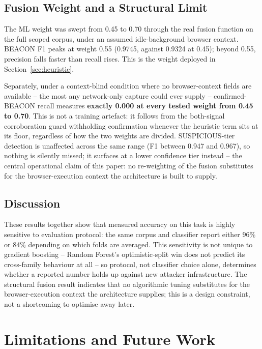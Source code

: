 \documentclass[conference,a4paper]{IEEEtran}
\begin{document}
\subsection{Fusion Weight and a Structural Limit}\label{sec:fusionlimit}
The ML weight was swept from 0.45 to 0.70 through the real fusion function on the full scoped corpus, under an assumed idle-background browser context. BEACON F1 peaks at weight 0.55 (0.9745, against 0.9324 at 0.45); beyond 0.55, precision falls faster than recall rises. This is the weight deployed in Section~\ref{sec:heuristic}.

Separately, under a context-blind condition where no browser-context fields are available -- the most any network-only capture could ever supply -- confirmed-BEACON recall measures \textbf{exactly 0.000 at every tested weight from 0.45 to 0.70}. This is not a training artefact: it follows from the both-signal corroboration guard withholding confirmation whenever the heuristic term sits at its floor, regardless of how the two weights are divided. SUSPICIOUS-tier detection is unaffected across the same range (F1 between 0.947 and 0.967), so nothing is silently missed; it surfaces at a lower confidence tier instead -- the central operational claim of this paper: no re-weighting of the fusion substitutes for the browser-execution context the architecture is built to supply.

\subsection{Discussion}
These results together show that measured accuracy on this task is highly sensitive to evaluation protocol: the same corpus and classifier report either 96\% or 84\% depending on which folds are averaged. This sensitivity is not unique to gradient boosting -- Random Forest's optimistic-split win does not predict its cross-family behaviour at all -- so protocol, not classifier choice alone, determines whether a reported number holds up against new attacker infrastructure. The structural fusion result indicates that no algorithmic tuning substitutes for the browser-execution context the architecture supplies; this is a design constraint, not a shortcoming to optimise away later.

\section{Limitations and Future Work}\label{sec:limitations}
\end{document}
